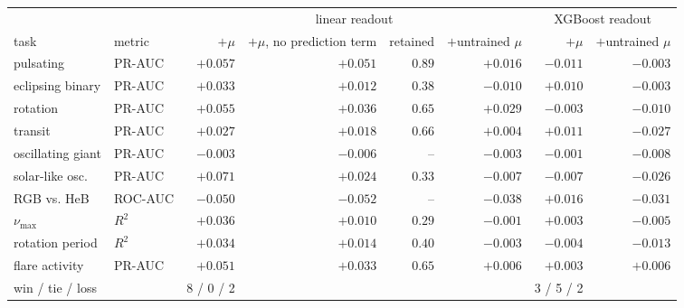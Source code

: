 \begin{tabular}{llrrrrrr}
\toprule
 & & \multicolumn{4}{c}{linear readout} & \multicolumn{2}{c}{XGBoost readout} \\
\cmidrule(lr){3-6}\cmidrule(lr){7-8}
task & metric & $+\mu$ & $+\mu$, no prediction term & retained & $+$untrained $\mu$ & $+\mu$ & $+$untrained $\mu$ \\
\midrule
pulsating & PR-AUC & $\boldsymbol{+}\mathbf{0.057}$ & $\boldsymbol{+}\mathbf{0.051}$ & $0.89$ & ${+}0.016$ & ${-}0.011$ & ${-}0.003$ \\
eclipsing binary & PR-AUC & $\boldsymbol{+}\mathbf{0.033}$ & $\boldsymbol{+}\mathbf{0.012}$ & $0.38$ & ${-}0.010$ & $\boldsymbol{+}\mathbf{0.010}$ & ${-}0.003$ \\
rotation & PR-AUC & $\boldsymbol{+}\mathbf{0.055}$ & $\boldsymbol{+}\mathbf{0.036}$ & $0.65$ & ${+}0.029$ & $\boldsymbol{-}\mathbf{0.003}$ & ${-}0.010$ \\
transit & PR-AUC & $\boldsymbol{+}\mathbf{0.027}$ & $\boldsymbol{+}\mathbf{0.018}$ & $0.66$ & ${+}0.004$ & ${+}0.011$ & ${-}0.027$ \\
oscillating giant & PR-AUC & $\boldsymbol{-}\mathbf{0.003}$ & $\boldsymbol{-}\mathbf{0.006}$ & -- & ${-}0.003$ & ${-}0.001$ & ${-}0.008$ \\
solar-like osc. & PR-AUC & $\boldsymbol{+}\mathbf{0.071}$ & $\boldsymbol{+}\mathbf{0.024}$ & $0.33$ & ${-}0.007$ & ${-}0.007$ & ${-}0.026$ \\
RGB vs. HeB & ROC-AUC & $\boldsymbol{-}\mathbf{0.050}$ & $\boldsymbol{-}\mathbf{0.052}$ & -- & ${-}0.038$ & $\boldsymbol{+}\mathbf{0.016}$ & ${-}0.031$ \\
$\nu_{\max}$ & $R^2$ & $\boldsymbol{+}\mathbf{0.036}$ & $\boldsymbol{+}\mathbf{0.010}$ & $0.29$ & ${-}0.001$ & $\boldsymbol{+}\mathbf{0.003}$ & ${-}0.005$ \\
rotation period & $R^2$ & $\boldsymbol{+}\mathbf{0.034}$ & $\boldsymbol{+}\mathbf{0.014}$ & $0.40$ & ${-}0.003$ & $\boldsymbol{-}\mathbf{0.004}$ & ${-}0.013$ \\
flare activity & PR-AUC & $\boldsymbol{+}\mathbf{0.051}$ & $\boldsymbol{+}\mathbf{0.033}$ & $0.65$ & ${+}0.006$ & ${+}0.003$ & ${+}0.006$ \\
\midrule
win / tie / loss & & 8 / 0 / 2 & & & & 3 / 5 / 2 & \\
\bottomrule
\end{tabular}

